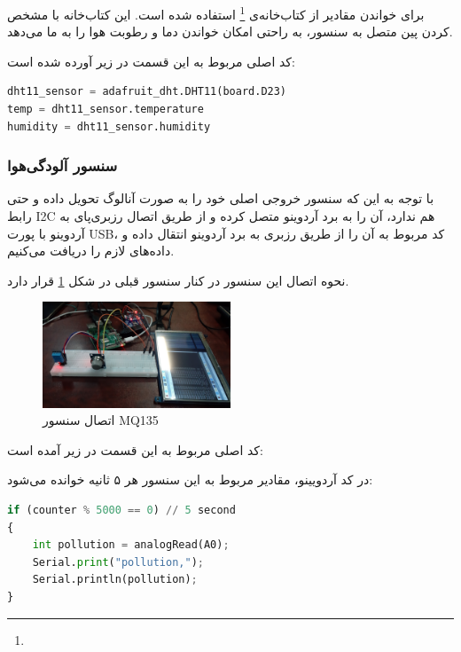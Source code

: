 برای خواندن مقادیر از کتاب‌خانه‌ی 
\footnote{}
استفاده شده است. این کتاب‌خانه با مشخص کردن پین متصل به سنسور، به راحتی امکان خواندن دما و رطوبت هوا را به ما می‌دهد.

کد اصلی مربوط به این قسمت در زیر آورده شده است:

\begin{latin}
\begin{lstlisting}[language=python]
dht11_sensor = adafruit_dht.DHT11(board.D23)
temp = dht11_sensor.temperature
humidity = dht11_sensor.humidity
\end{lstlisting}
\end{latin}

\subsubsection{سنسور آلودگی‌هوا}

با توجه به این که  سنسور  خروجی اصلی خود را به صورت آنالوگ تحویل داده و حتی رابط I2C هم ندارد، آن را به برد آردوینو متصل کرده و از طریق اتصال رزبری‌پای به آردوینو با پورت USB، کد مربوط به آن را از طریق رزبری به برد آردوینو انتقال داده و داده‌های لازم را دریافت می‌کنیم.

نحوه اتصال این سنسور در کنار سنسور قبلی در شکل \ref{fig:3} قرار دارد.

\begin{figure}[h]
	\centering
	\includegraphics[width=0.5\textwidth]{figs/dhtmq2.jpg}
	
	\caption{اتصال سنسور MQ135}
	\label{fig:3}
\end{figure}

کد اصلی مربوط به این قسمت در زیر آمده است:

در کد آردویینو، مقادیر مربوط به این سنسور هر ۵ ثانیه خوانده می‌شود:
\begin{latin}
	\begin{lstlisting}[language=python]
if (counter % 5000 == 0) // 5 second
{
	int pollution = analogRead(A0);
	Serial.print("pollution,");
	Serial.println(pollution);
} 
	\end{lstlisting}
\end{latin}


